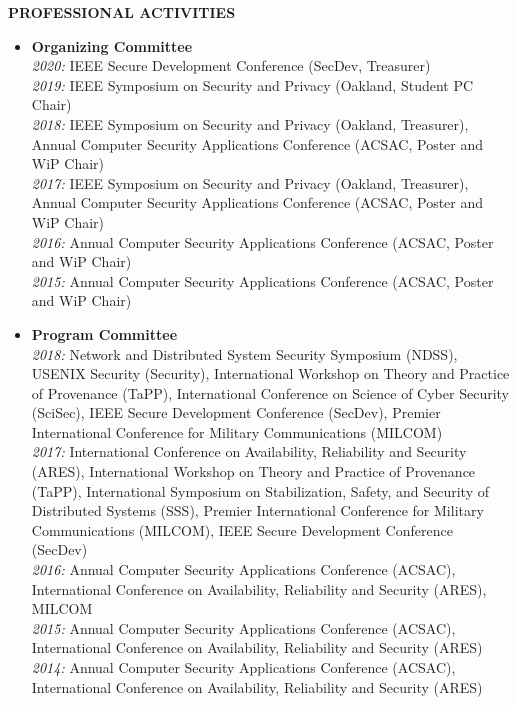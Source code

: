 \documentclass[10pt]{article}
\begin{document}
\vspace{1em} {\Large \textbf{PROFESSIONAL ACTIVITIES}}
\begin{itemize}
  \item \textbf{Organizing Committee}\\
    \textit{2020:} IEEE Secure Development Conference (SecDev, Treasurer)\\
    \textit{2019:} IEEE Symposium on Security and Privacy (Oakland, Student PC Chair)\\
    \textit{2018:} IEEE Symposium on Security and Privacy (Oakland, Treasurer), Annual Computer Security Applications Conference (ACSAC, Poster and WiP Chair)\\
    \textit{2017:} IEEE Symposium on Security and Privacy (Oakland, Treasurer), Annual Computer Security Applications Conference (ACSAC, Poster and WiP Chair)\\
    \textit{2016:} Annual Computer Security Applications Conference (ACSAC, Poster and WiP Chair)\\
    \textit{2015:} Annual Computer Security Applications Conference (ACSAC, Poster and WiP Chair)
  \item \textbf{Program Committee}\\
    \textit{2018:} Network and Distributed System Security Symposium (NDSS), USENIX Security (Security), International Workshop on Theory and Practice of Provenance (TaPP), International Conference on Science of Cyber Security (SciSec), IEEE Secure Development Conference (SecDev), Premier International Conference for Military Communications (MILCOM)\\
    \textit{2017:} International Conference on Availability, Reliability and Security (ARES), International Workshop on Theory and Practice of Provenance (TaPP), International Symposium on Stabilization, Safety, and Security of Distributed Systems (SSS), Premier International Conference for Military Communications (MILCOM), IEEE Secure Development Conference (SecDev)\\
    \textit{2016:} Annual Computer Security Applications Conference (ACSAC), International Conference on Availability, Reliability and Security (ARES), MILCOM\\
    \textit{2015:} Annual Computer Security Applications Conference (ACSAC), International Conference on Availability, Reliability and Security (ARES)\\
    \textit{2014:} Annual Computer Security Applications Conference (ACSAC), International Conference on Availability, Reliability and Security (ARES)\\

\end{itemize}
\end{document}
